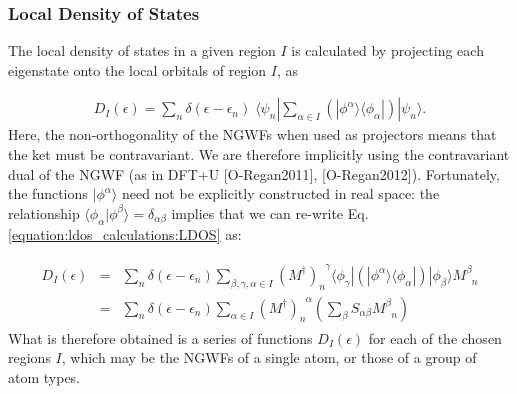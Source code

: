 \documentclass[letterpaper,10pt,english]{sphinxmanual}
\begin{document}
\subsubsection{Local Density of States}
\label{\detokenize{ldos_calculations:local-density-of-states}}
The local density of states in a given region \(I\) is calculated by
projecting each eigenstate onto the local orbitals of region \(I\),
as

\label{\detokenize{ldos_calculations:equation-ldos}}\begin{equation}\label{equation:ldos_calculations:LDOS}
\begin{split}D_{I}(\epsilon)=\sum_{n}\delta(\epsilon-\epsilon_{n})\;\langle\psi_{n}|\sum_{\alpha\in I}\left(|\phi^{\alpha}\rangle\langle\phi_{\alpha}|\right)|\psi_{n}\rangle.\end{split}
\end{equation}
Here, the non-orthogonality of the NGWFs when used as projectors means
that the ket must be contravariant. We are therefore implicitly using
the contravariant dual of the NGWF (as in DFT+U
{[}O-Regan2011{]}, {[}O-Regan2012{]}).
Fortunately, the functions \(|\phi^{\alpha}\rangle\) need not be
explicitly constructed in real space: the relationship
\(\langle\phi_{\alpha}|\phi^{\beta}\rangle=\delta_{\alpha\beta}\)
implies that we can re-write Eq. \eqref{equation:ldos_calculations:LDOS} as:

\label{\detokenize{ldos_calculations:equation-ldos2}}\begin{equation}\label{equation:ldos_calculations:LDOS2}
\begin{split}\begin{aligned}
D_{I}(\epsilon) & = & \sum_{n}\!\delta(\epsilon-\epsilon_{n})\!\!\!\!\!\!\sum_{\beta,\gamma,\alpha\in I}\!\!\!\!(M^{\dagger})_{n}^{\phantom{n}\gamma}\langle\phi_{\gamma}|\left(|\phi^{\alpha}\rangle\langle\phi_{\alpha}|\right)|\phi_{\beta}\rangle M_{\phantom{\beta}n}^{\beta}\nonumber \\
 & = & \sum_{n}\delta(\epsilon-\epsilon_{n})\sum_{\alpha\in I}(M^{\dagger})_{n}^{\phantom{n}\alpha}(\sum_{\beta}S_{\alpha\beta}M_{\phantom{\beta}n}^{\beta})\end{aligned}\end{split}
\end{equation}
What is therefore obtained is a series of functions
\(D_{I}(\epsilon)\) for each of the chosen regions \(I\), which
may be the NGWFs of a single atom, or those of a group of atom types.
\end{document}
